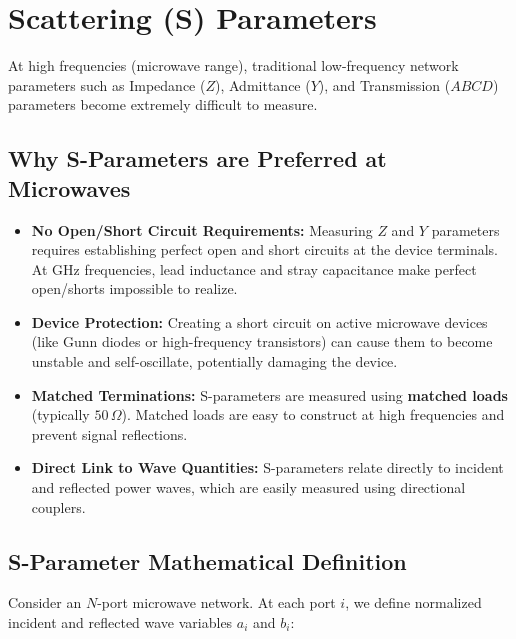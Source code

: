 \documentclass[12pt,a4paper]{article}
\begin{document}
\section{Scattering (S) Parameters}

At high frequencies (microwave range), traditional low-frequency network parameters such as Impedance ($Z$), Admittance ($Y$), and Transmission ($ABCD$) parameters become extremely difficult to measure.

\subsection{Why S-Parameters are Preferred at Microwaves}
\begin{itemize}[leftmargin=*, itemsep=4pt]
  \item \textbf{No Open/Short Circuit Requirements:} Measuring $Z$ and $Y$ parameters requires establishing perfect open and short circuits at the device terminals. At GHz frequencies, lead inductance and stray capacitance make perfect open/shorts impossible to realize.
  \item \textbf{Device Protection:} Creating a short circuit on active microwave devices (like Gunn diodes or high-frequency transistors) can cause them to become unstable and self-oscillate, potentially damaging the device.
  \item \textbf{Matched Terminations:} S-parameters are measured using \textbf{matched loads} (typically $50\,\Omega$). Matched loads are easy to construct at high frequencies and prevent signal reflections.
  \item \textbf{Direct Link to Wave Quantities:} S-parameters relate directly to incident and reflected power waves, which are easily measured using directional couplers.
\end{itemize}

\subsection{S-Parameter Mathematical Definition}
Consider an $N$-port microwave network. At each port $i$, we define normalized incident and reflected wave variables $a_i$ and $b_i$:
\end{document}
